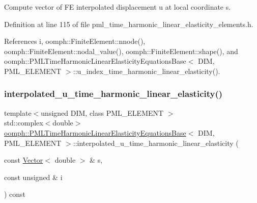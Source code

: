 Compute vector of FE interpolated displacement u at local coordinate s. 



Definition at line 115 of file pml\+\_\+time\+\_\+harmonic\+\_\+linear\+\_\+elasticity\+\_\+elements.\+h.



References i, oomph\+::\+Finite\+Element\+::nnode(), oomph\+::\+Finite\+Element\+::nodal\+\_\+value(), oomph\+::\+Finite\+Element\+::shape(), and oomph\+::\+P\+M\+L\+Time\+Harmonic\+Linear\+Elasticity\+Equations\+Base$<$ D\+I\+M, P\+M\+L\+\_\+\+E\+L\+E\+M\+E\+N\+T $>$\+::u\+\_\+index\+\_\+time\+\_\+harmonic\+\_\+linear\+\_\+elasticity().

\mbox{\label{classoomph_1_1PMLTimeHarmonicLinearElasticityEquationsBase_a5b5743ede86b76b583c6c881d1b2b862}} 
\subsubsection{\texorpdfstring{interpolated\+\_\+u\+\_\+time\+\_\+harmonic\+\_\+linear\+\_\+elasticity()}{interpolated\_u\_time\_harmonic\_linear\_elasticity()}\hspace{0.1cm}{\footnotesize\ttfamily [2/2]}}
{\footnotesize\ttfamily template$<$unsigned D\+IM, class P\+M\+L\+\_\+\+E\+L\+E\+M\+E\+NT $>$ \\
std\+::complex$<$double$>$ \hyperlink{classoomph_1_1PMLTimeHarmonicLinearElasticityEquationsBase}{oomph\+::\+P\+M\+L\+Time\+Harmonic\+Linear\+Elasticity\+Equations\+Base}$<$ D\+IM, P\+M\+L\+\_\+\+E\+L\+E\+M\+E\+NT $>$\+::interpolated\+\_\+u\+\_\+time\+\_\+harmonic\+\_\+linear\+\_\+elasticity (\begin{DoxyParamCaption}\item[{const \hyperlink{classoomph_1_1Vector}{Vector}$<$ double $>$ \&}]{s,  }\item[{const unsigned \&}]{i }\end{DoxyParamCaption}) const\hspace{0.3cm}{\ttfamily [inline]}}



